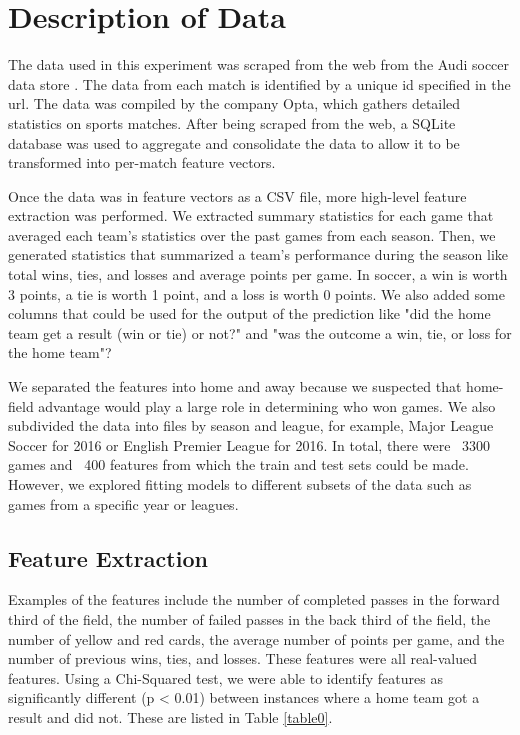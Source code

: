 \section {Description of Data}

The data used in this experiment was scraped from the web from the Audi soccer data store \cite{audi}. The data from each match is identified by a unique id specified in the url. The data was compiled by the company Opta, which gathers detailed statistics on sports matches. After being scraped from the web, a SQLite database was used to aggregate and consolidate the data to allow it to be transformed into per-match feature vectors.

Once the data was in feature vectors as a CSV file, more high-level feature extraction was performed. We extracted summary statistics for each game that averaged each team's statistics over the past games from each season. Then, we generated statistics that summarized a team's performance during the season like total wins, ties, and losses and average points per game. In soccer, a win is worth 3 points, a tie is worth 1 point, and a loss is worth 0 points. We also added some columns that could be used for the output of the prediction like "did the home team get a result (win or tie) or not?" and "was the outcome a win, tie, or loss for the home team"? 

We separated the features into home and away because we suspected that home-field advantage would play a large role in determining who won games. We also subdivided the data into files by season and league, for example, Major League Soccer for 2016 or English Premier League for 2016. In total, there were ~3300 games and ~400 features from which the train and test sets could be made. However, we explored fitting models to different subsets of the data such as games from a specific year or leagues.

\subsection{Feature Extraction}

Examples of the features include the number of completed passes in the forward third of the field, the number of failed passes in the back third of the field, the number of yellow and red cards, the average number of points per game, and the number of previous wins, ties, and losses. These features were all real-valued features. Using a Chi-Squared test, we were able to identify features as significantly different (p < 0.01) between instances where a home team got a result and did not. These are listed in Table \ref{table0}.

